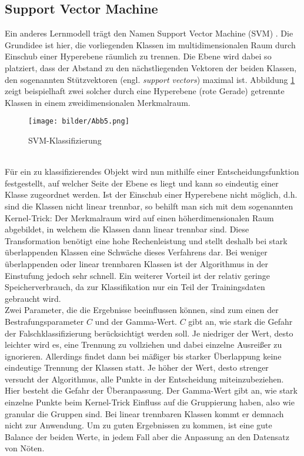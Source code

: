 \subsection{Support Vector Machine}
Ein anderes Lernmodell trägt den Namen Support Vector Machine (SVM) \citep{Nayak15}. Die Grundidee ist hier, die vorliegenden Klassen im multidimensionalen Raum durch Einschub einer Hyperebene räumlich zu trennen. Die Ebene wird dabei so platziert, dass der Abstand zu den nächstliegenden Vektoren der beiden Klassen, den sogenannten Stützvektoren (engl. \textit{support vectors}) maximal ist. Abbildung \ref{svm-alg} zeigt beispielhaft zwei solcher durch eine Hyperebene (rote Gerade) getrennte Klassen in einem zweidimensionalen Merkmalraum. 
\begin{figure}[htb]
	\begin{center}
		\texttt{[image: bilder/Abb5.png]}
		\caption{SVM-Klassifizierung \citep{Zhou16}}\label{svm-alg}
	\end{center}
\end{figure}\\
 Für ein zu klassifizierendes Objekt wird nun mithilfe einer Entscheidungsfunktion festgestellt, auf welcher Seite der Ebene es liegt und kann so eindeutig einer Klasse zugeordnet werden. Ist der Einschub einer Hyperebene nicht möglich, d.h. sind die Klassen nicht linear trennbar, so behilft man sich mit dem sogenannten \glqq Kernel-Trick\grqq{}: Der Merkmalraum wird auf einen höherdimensionalen Raum abgebildet, in welchem die Klassen dann linear trennbar sind. Diese Transformation benötigt eine hohe Rechenleistung und stellt deshalb bei stark überlappenden Klassen eine Schwäche dieses Verfahrens dar. Bei weniger überlappenden oder linear trennbaren Klassen ist der Algorithmus in der Einstufung jedoch sehr schnell. Ein weiterer Vorteil ist der relativ geringe Speicherverbrauch, da zur Klassifikation nur ein Teil der Trainingsdaten gebraucht wird.\\
 Zwei Parameter, die die Ergebnisse beeinflussen können, sind zum einen der Bestrafungsparameter $C$ und der Gamma-Wert. $C$ gibt an, wie stark die Gefahr der Falschklassifizierung berücksichtigt werden soll. Je niedriger der Wert, desto leichter wird es, eine Trennung zu vollziehen und dabei einzelne Ausreißer zu ignorieren. Allerdings findet dann bei mäßiger bis starker Überlappung keine eindeutige Trennung der Klassen statt. Je höher der Wert, desto strenger versucht der Algorithmus, alle Punkte in der Entscheidung miteinzubeziehen. Hier besteht die Gefahr der Überanpassung. Der Gamma-Wert gibt an, wie stark einzelne Punkte beim Kernel-Trick Einfluss auf die Gruppierung haben, also wie granular die Gruppen sind. Bei linear trennbaren Klassen kommt er demnach nicht zur Anwendung. Um zu guten Ergebnissen zu kommen, ist eine gute Balance der beiden Werte, in jedem Fall aber die Anpassung an den Datensatz von Nöten.

